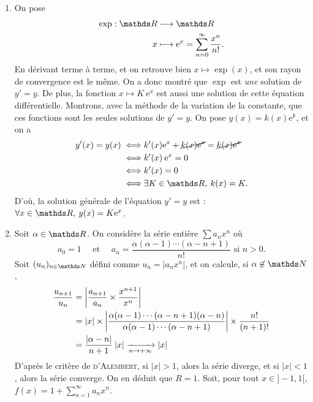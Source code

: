 \begin{exm}
	\begin{enumerate}
		\item On pose
			\begin{align*}
				\exp: \R &\longrightarrow \R \\
				x &\longmapsto \mathrm{e}^{x} = \sum_{n=0}^{\infty} \frac{x^n}{n!}.
			\end{align*}
			En dérivant terme à terme, et on retrouve bien $x \mapsto \exp (x)$, et son rayon de convergence est le même.
			On a donc montré que $\exp$\/ est \textit{une} solution de $y' = y$. De plus, la fonction $x \mapsto K\:\mathrm{e}^{x}$\/ est aussi une solution de cette équation différentielle.
			Montrons, avec la méthode de la variation de la constante, que ces fonctions sont les seules solutions de $y'= y$. On pose $y(x) = k(x) \mathrm{e}^k$, et on a
			\begin{align*}
				y'(x) = y(x) \iff& k'(x) \mathrm{e}^{x} + \cancel{k(x) \mathrm{e}^{x}} = \cancel{k(x)\mathrm{e}^{x}} \\
				\iff& k'(x)\: \mathrm{e}^{x} = 0 \\
				\iff&  k'(x) = 0 \\
				\iff& \exists K \in \R,\: k(x) = K.
			\end{align*}
			D'où, la solution générale de l'équation $y' = y$\/ est : $\forall x \in \R,\: y(x) = K \mathrm{e}^{x}$.
		\item Soit $\alpha \in \R$. On considère la série entière $\sum a_n x^n$\/ où \[
				a_0 = 1\quad \text{ et } \quad a_n = \frac{\alpha(\alpha - 1)\cdots (\alpha - n + 1)}{n!} \text{ si } n > 0
			.\] Soit $(u_n)_{n\in\N}$\/ défini comme $u_n = |a_n x^n|$, et on calcule, si $\alpha \not\in \N$,
			\begin{align*}
				\frac{u_{n+1}}{u_n} &= \left| \frac{a_{n+1}}{a_n} \times \frac{x^{n+1}}{x^n} \right|\\
				&= |x| \times \left|\frac{\alpha (\alpha - 1)\cdots (\alpha-n+1) (\alpha - n)}{\alpha (\alpha - 1)\cdots (\alpha-n+1)}\right| \times \frac{n!}{(n+1)!} \\
				&= \frac{|\alpha-n|}{n + 1}\:|x| \xrightarrow[n\to +\infty]{} |x| \\
			\end{align*}
			D'après le critère de \textsc{d'Alembert}, si $|x| > 1$, alors la série diverge, et si $|x| < 1$, alors la série converge. On en déduit que $R = 1$.
			Soit, pour tout $x \in {]-1,1[}$, $f(x) = 1 + \sum_{n=1}^\infty a_n x^n$.

\end{enumerate}
\end{exm}
